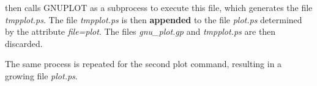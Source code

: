 \madx then calls GNUPLOT as a subprocess to execute this file, which
generates the file \textit{tmpplot.ps}.  
The file \textit{tmpplot.ps} is then {\bf appended} to the file
\textit{plot.ps} determined by the attribute \textit{file=plot}.  
The files \textit{gnu\_plot.gp} and \textit{tmpplot.ps} are then
discarded. 

The same process is repeated for the second plot command, resulting in a
growing file \textit{plot.ps}.




